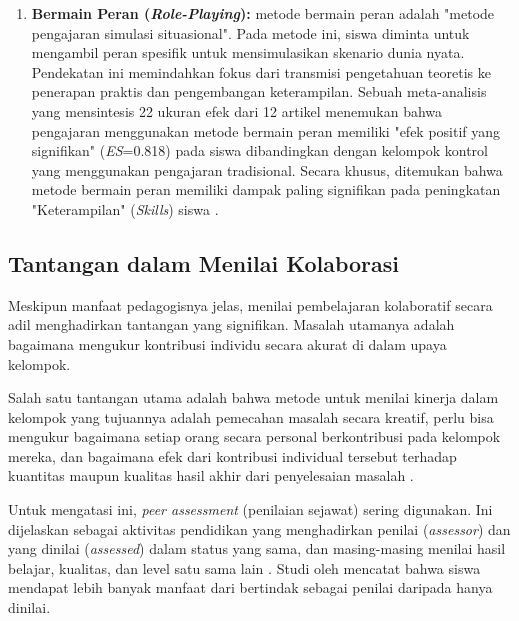 \begin{enumerate}
    \item \textbf{Bermain Peran (\textit{Role-Playing}):} metode bermain peran adalah "metode pengajaran simulasi situasional". Pada
    metode ini, siswa diminta untuk mengambil peran spesifik untuk mensimulasikan
    skenario dunia nyata. Pendekatan ini memindahkan fokus dari
    transmisi pengetahuan teoretis ke penerapan praktis dan pengembangan keterampilan.
    Sebuah meta-analisis yang mensintesis 22 ukuran efek dari 12 artikel menemukan
    bahwa pengajaran menggunakan metode bermain peran memiliki "efek positif yang
    signifikan" (\textit{ES}=0.818) pada siswa dibandingkan dengan kelompok kontrol
    yang menggunakan pengajaran tradisional. Secara khusus,
    ditemukan bahwa metode bermain peran memiliki dampak paling signifikan pada
    peningkatan "Keterampilan" (\textit{Skills}) siswa \autocite{Fu2025}.
\end{enumerate}

\subsection{Tantangan dalam Menilai Kolaborasi}
\label{ssec:tantangan_menilai_kolaborasi}
Meskipun manfaat pedagogisnya jelas, menilai pembelajaran kolaboratif secara
adil menghadirkan tantangan yang signifikan. Masalah utamanya adalah bagaimana
mengukur kontribusi individu secara akurat di dalam upaya kelompok.

Salah satu tantangan utama adalah bahwa metode untuk menilai kinerja dalam kelompok
yang tujuannya adalah pemecahan masalah secara kreatif, perlu bisa mengukur bagaimana
setiap orang secara personal berkontribusi pada kelompok mereka, dan bagaimana
efek dari kontribusi individual tersebut terhadap kuantitas maupun kualitas hasil
akhir dari penyelesaian masalah \autocite{Ryoo2021}.

Untuk mengatasi ini, \textit{peer assessment} (penilaian sejawat) sering digunakan.
Ini dijelaskan sebagai aktivitas pendidikan yang menghadirkan penilai
(\textit{assessor}) dan yang dinilai (\textit{assessed}) dalam status yang sama,
dan masing-masing menilai hasil belajar, kualitas, dan level satu sama lain
\autocite{Ihichr2024}. Studi oleh \textcite{Ihichr2024} mencatat bahwa siswa mendapat
lebih banyak manfaat dari bertindak sebagai penilai daripada hanya dinilai.

